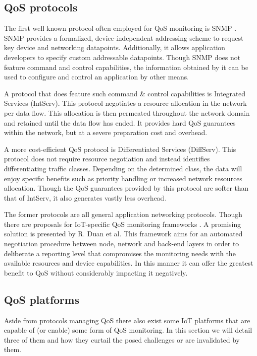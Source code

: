 \subsection{QoS protocols}
\label{sec:qos-protocols}
The first well known protocol often employed for QoS monitoring is SNMP \cite{snmp}. SNMP provides a formalized, device-independent addressing scheme to request key device and networking datapoints. Additionally, it allows application developers to specify custom addressable datapoints. Though SNMP does not feature command and control capabilities, the information obtained by it can be used to configure and control an application by other means.

A protocol that does feature such command \& control capabilities is Integrated Services (IntServ)\cite{intserv_diffserv_uitleg}. This protocol negotiates a resource allocation in the network per data flow. This allocation is then permeated throughout the network domain and retained until the data flow has ended. It provides hard QoS guarantees within the network, but at a severe preparation cost and overhead.

A more cost-efficient QoS protocol is Differentiated Services (DiffServ)\cite{intserv_diffserv_uitleg}. This protocol does not require resource negotiation and instead identifies differentiating traffic classes. Depending on the determined class, the data will enjoy specific benefits such as priority handling or increased network resources allocation. Though the QoS guarantees provided by this protocol are softer than that of IntServ, it also generates vastly less overhead.

The former protocols are all general application networking protocols. Though there are proposals for IoT-specific QoS monitoring frameworks \cite{survey_iot_qos}. A promising solution is presented by R. Duan et al\cite{todo:refs}. This framework aims for an automated negotiation procedure between node, network and back-end layers in order to deliberate a reporting level that compromises the monitoring needs with the available resources and device capabilities. In this manner it can offer the greatest benefit to QoS without considerably impacting it negatively.

\subsection{QoS platforms}
Aside from protocols managing QoS there also exist some IoT platforms that are capable of (or enable) some form of QoS monitoring. In this section we will detail three of them and how they curtail the posed challenges or are invalidated by them.
